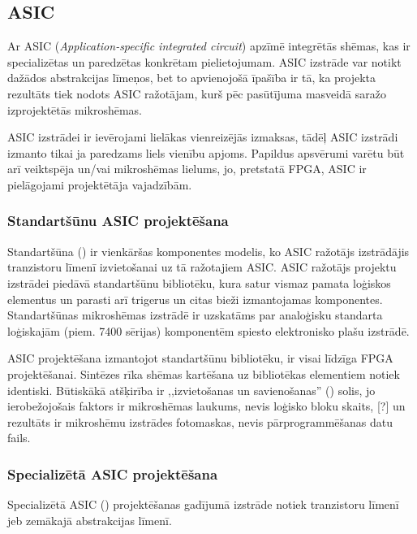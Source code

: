 	
\subsection{ASIC} \label{sec:asic}
	Ar ASIC (\textit{Application-specific integrated circuit}) apzīmē
	integrētās shēmas, kas ir specializētas un paredzētas konkrētam
	pielietojumam. ASIC izstrāde var notikt dažādos abstrakcijas līmeņos,
	bet to apvienojošā īpašība ir tā, ka projekta rezultāts tiek nodots
	ASIC ražotājam, kurš pēc pasūtījuma 
	masveidā saražo izprojektētās mikroshēmas.
	
	ASIC izstrādei ir ievērojami lielākas vienreizējās izmaksas, tādēļ ASIC
	izstrādi izmanto tikai ja paredzams liels vienību apjoms. Papildus
	apsvērumi varētu būt arī veiktspēja un/vai mikroshēmas lielums, jo,
	pretstatā FPGA, ASIC ir pielāgojami projektētāja vajadzībām.
	
	\subsubsection{Standartšūnu ASIC projektēšana}
		Standartšūna () ir vienkāršas komponentes
		modelis, ko ASIC ražotājs izstrādājis tranzistoru līmenī
		izvietošanai uz tā ražotajiem ASIC. ASIC ražotājs projektu
		izstrādei piedāvā standartšūnu bibliotēku, kura satur vismaz pamata
		loģiskos elementus un parasti arī trigerus un citas bieži
		izmantojamas komponentes. Standartšūnas mikroshēmas izstrādē ir
		uzskatāms par analoģisku standarta loģiskajām (piem. 7400 sērijas)
		komponentēm spiesto elektronisko plašu izstrādē.
	
		ASIC projektēšana izmantojot standartšūnu bibliotēku, ir visai
		līdzīga FPGA projektēšanai. Sintēzes rīka shēmas kartēšana uz
		bibliotēkas elementiem notiek identiski. Būtiskākā atšķirība
		ir ,,izvietošanas un savienošanas'' () solis,
		jo ierobežojošais faktors ir mikroshēmas laukums, nevis
		loģisko bloku skaits, [\todo{}?] un rezultāts ir 
		mikroshēmu izstrādes fotomaskas, nevis
		pārprogrammēšanas datu fails.
	
	\subsubsection{Specializētā ASIC projektēšana}
		Specializētā ASIC () projektēšanas gadījumā
		izstrāde notiek tranzistoru līmenī jeb zemākajā abstrakcijas
		līmenī. \todo
		
		

